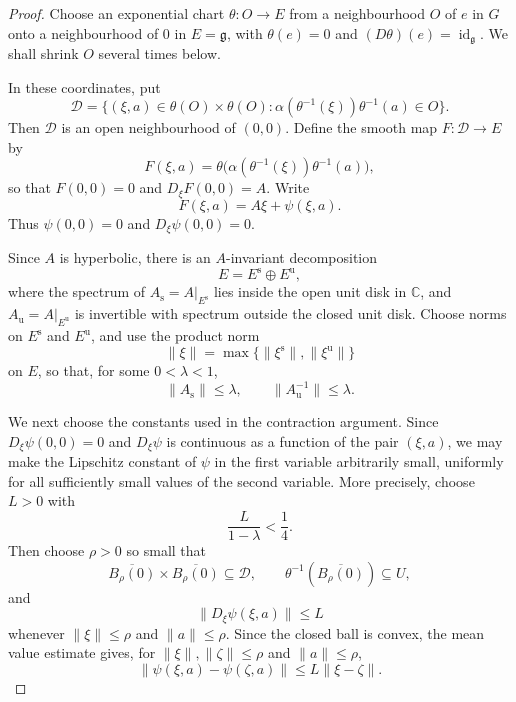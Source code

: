 \documentclass[10pt,a4paper]{amsart}
\begin{document}
\begin{proof}
Choose an exponential chart $\theta:O\to E$ from a neighbourhood $O$ of
$e$ in $G$ onto a neighbourhood of $0$ in $E=\mathfrak g$, with
$\theta(e)=0$ and $(D\theta)(e)=\operatorname{id}_{\mathfrak g}$. We shall
shrink $O$ several times below.

In these coordinates, put
\[
\mathcal D=\{(\xi,a)\in\theta(O)\times\theta(O):
\alpha(\theta^{-1}(\xi))\theta^{-1}(a)\in O\}.
\]
Then $\mathcal D$ is an open neighbourhood of $(0,0)$. Define the smooth
map $F:\mathcal D\to E$ by
\[
F(\xi,a)=\theta\bigl(\alpha(\theta^{-1}(\xi))\theta^{-1}(a)\bigr),
\]
so that $F(0,0)=0$ and $D_\xi F(0,0)=A$. Write
\[
F(\xi,a)=A\xi+\psi(\xi,a).
\]
Thus $\psi(0,0)=0$ and $D_\xi\psi(0,0)=0$.

Since $A$ is hyperbolic, there is an $A$-invariant decomposition
\begin{equation}\label{eq:splitting}
E=E^{\mathrm{s}}\oplus E^{\mathrm{u}},
\end{equation}
where the spectrum of $A_{\mathrm{s}}=A|_{E^{\mathrm{s}}}$ lies inside the
open unit disk in $\mathbb{C}$, and $A_{\mathrm{u}}=A|_{E^{\mathrm{u}}}$ is invertible with
spectrum outside the closed unit disk. Choose norms on
$E^{\mathrm{s}}$ and $E^{\mathrm{u}}$, and use the product norm
\[
\|\xi\|=\max\{\|\xi^{\mathrm{s}}\|,\|\xi^{\mathrm{u}}\|\}
\]
on $E$, so that, for some $0<\lambda<1$,
\begin{equation}\label{eq:lambda-estimate}
\|A_{\mathrm{s}}\|\leq\lambda,\qquad
\|A_{\mathrm{u}}^{-1}\|\leq\lambda.
\end{equation}

We next choose the constants used in the contraction argument. Since
$D_\xi\psi(0,0)=0$ and $D_\xi\psi$ is continuous as a function of the pair
$(\xi,a)$, we may make the Lipschitz constant of $\psi$ in the first
variable arbitrarily small, uniformly for all sufficiently small values of
the second variable. More precisely, choose $L>0$ with
\begin{equation}\label{eq:L-small}
\frac{L}{1-\lambda}<\frac14.
\end{equation}
Then choose $\rho>0$ so small that
\[
\overline{B_\rho(0)}\times\overline{B_\rho(0)}\subseteq\mathcal D,
\qquad
\theta^{-1}(\overline{B_\rho(0)})\subseteq U,
\]
and
\[
\|D_\xi\psi(\xi,a)\|\leq L
\]
whenever $\|\xi\|\leq\rho$ and $\|a\|\leq\rho$. Since the closed ball is
convex, the mean value estimate gives, for
$\|\xi\|,\|\zeta\|\leq\rho$ and $\|a\|\leq\rho$,
\begin{equation}\label{eq:psi-lipschitz}
\|\psi(\xi,a)-\psi(\zeta,a)\|\leq L\|\xi-\zeta\|.
\end{equation}


\end{proof}
\end{document}
